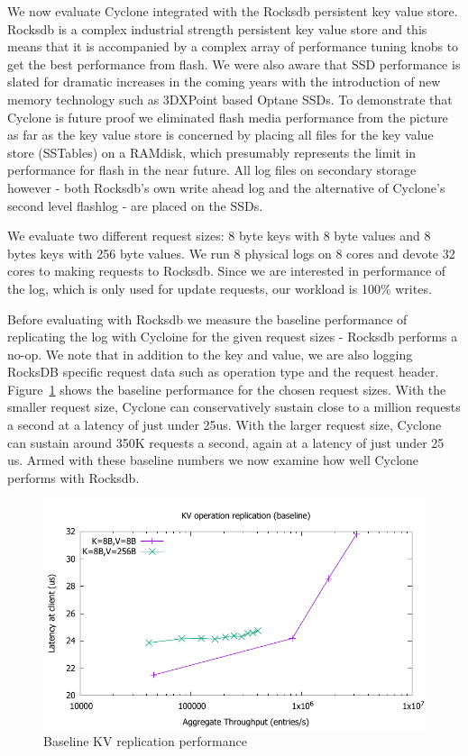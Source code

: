 \documentclass[10pt, preprint, nonatbib]{sigplanconf}
\begin{document}
We now evaluate Cyclone integrated with the Rocksdb persistent key value
store. Rocksdb is a complex industrial strength persistent key value store and
this means that it is accompanied by a complex array of performance tuning knobs
to get the best performance from flash. We were also aware that SSD performance
is slated for dramatic increases in the coming years with the introduction of
new memory technology such as 3DXPoint based Optane SSDs. To demonstrate that
Cyclone is future proof we eliminated flash media performance from the picture
as far as the key value store is concerned by placing all files for the key
value store (SSTables) on a RAMdisk, which presumably represents the limit in
performance for flash in the near future. All log files on secondary storage
however - both Rocksdb's own write ahead log and the alternative of Cyclone's
second level flashlog - are placed on the SSDs.

We evaluate two different request sizes: 8 byte keys with 8 byte values and 8
bytes keys with 256 byte values. We run 8 physical logs on 8 cores and devote 32
cores to making requests to Rocksdb. Since we are interested in performance of
the log, which is only used for update requests, our workload is 100\% writes.

Before evaluating with Rocksdb we measure the baseline performance of
replicating the log with Cycloine for the given request sizes - Rocksdb performs
a no-op. We note that in addition to the key and value, we are also logging
RocksDB specific request data such as operation type and the request header.
Figure~\ref{fig:kv_baseline} shows the baseline performance for the chosen
request sizes. With the smaller request size, Cyclone can conservatively sustain
close to a million requests a second at a latency of just under 25us. With the
larger request size, Cyclone can sustain around 350K requests a second, again at
a latency of just under 25 us. Armed with these baseline numbers we now examine
how well Cyclone performs with Rocksdb.

\begin{figure}
\includegraphics[scale=0.6]{results2/kv_baseline.pdf}
\caption{Baseline KV replication performance}
\label{fig:kv_baseline}
\end{figure}
\end{document}

